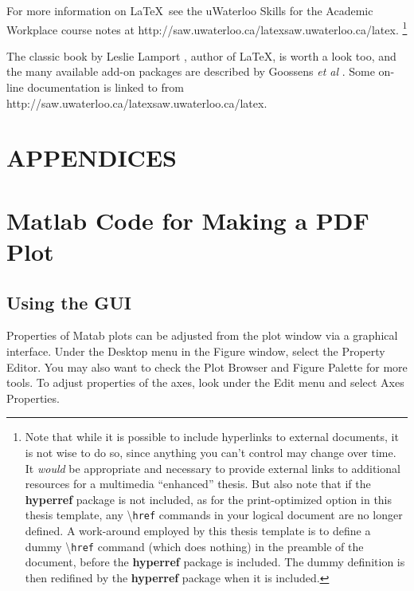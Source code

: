 \documentclass[letterpaper,12pt,titlepage,oneside,final]{book}
\newcommand{\package}[1]{\textbf{#1}} %
\newcommand{\cmmd}[1]{\textbackslash\texttt{#1}} %
\newcommand{\href}[1]{#1} %
\begin{document}
For more information on \LaTeX\, see the uWaterloo Skills for the Academic Workplace 
course notes at \href{http://saw.uwaterloo.ca/latex}{saw.uwaterloo.ca/latex}. 
\footnote{
Note that while it is possible to include hyperlinks to external documents,
it is not wise to do so, since anything you can't control may change over time. 
It \emph{would} be appropriate and necessary to provide external links to 
additional resources for a multimedia ``enhanced'' thesis. 
But also note that if the \package{hyperref} package is not included, 
as for the print-optimized option in this thesis template, any \cmmd{href} 
commands in your logical document are no longer defined.
A work-around employed by this thesis template is to define a dummy \cmmd{href} 
command (which does nothing) in the preamble of the document, 
before the \package{hyperref} package is included. 
The dummy definition is then redifined by the
\package{hyperref} package when it is included.
}

The classic book by Leslie Lamport \cite{lamport.book}, author of \LaTeX , is worth a look too, and the many available add-on packages are described by 
Goossens \textit{et al} \cite{goossens.book}. Some on-line documentation is linked
to from \href{http://saw.uwaterloo.ca/latex}{saw.uwaterloo.ca/latex}.

\appendix

\chapter*{APPENDICES}
\chapter[PDF Plots From Matlab]{Matlab Code for Making a PDF Plot}
\label{AppendixA}
\section{Using the GUI}
Properties of Matab plots can be adjusted from the plot window via a graphical interface. Under the Desktop menu in the Figure window, select the Property Editor. You may also want to check the Plot Browser and Figure Palette for more tools. To adjust properties of the axes, look under the Edit menu and select Axes Properties.
\end{document}
